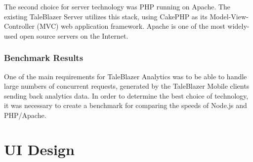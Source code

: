 The second choice for server technology was PHP running on Apache. The existing TaleBlazer Server utilizes this stack, using CakePHP as its Model-View-Controller (MVC) web application framework. Apache is one of the most widely-used open source servers on the Internet.

\subsubsection{Benchmark Results}

One of the main requirements for TaleBlazer Analytics was to be able to handle large numbers of concurrent requests, generated by the TaleBlazer Mobile clients sending back analytics data. In order to determine the best choice of technology, it was necessary to create a benchmark for comparing the speeds of Node.js and PHP/Apache. 

\section{UI Design}
